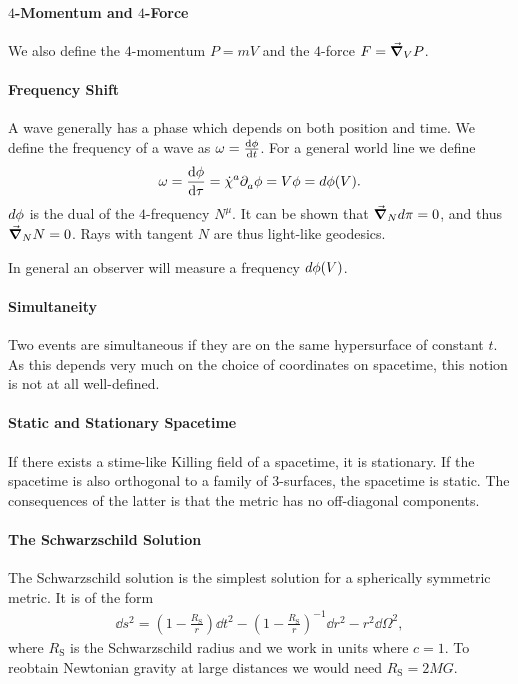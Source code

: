 \paragraph{$4$-Momentum and $4$-Force}
We also define the $4$-momentum $P = mV$ and the $4$-force $F = \grad_{V}{P}$.

\paragraph{Frequency Shift}
A wave generally has a phase which depends on both position and time. We define the frequency of a wave as $\omega = \dv{\phi}{t}$. For a general world line we define
\begin{align*}
	\omega = \dv{\phi}{\tau} = \dot{\chi}^{a}\partial^{}_{a}\phi = V\phi = d\phi(V).
\end{align*}
$d\phi$ is the dual of the $4$-frequency $N^{\mu}$. It can be shown that $\grad_{N}{d\pi} = 0$, and thus $\grad_{N}{N} = 0$. Rays with tangent $N$ are thus light-like geodesics.

In general an observer will measure a frequency $d\phi(V)$.

\paragraph{Simultaneity}
Two events are simultaneous if they are on the same hypersurface of constant $t$. As this depends very much on the choice of coordinates on spacetime, this notion is not at all well-defined.

\paragraph{Static and Stationary Spacetime}
If there exists a stime-like Killing field of a spacetime, it is stationary. If the spacetime is also orthogonal to a family of $3$-surfaces, the spacetime is static. The consequences of the latter is that the metric has no off-diagonal components.

\paragraph{The Schwarzschild Solution}
The Schwarzschild solution is the simplest solution for a spherically symmetric metric. It is of the form
\begin{align*}
	\dd{s}^{2} = \left(1 - \frac{R_{\text{S}}}{r}\right)\dd{t}^{2} - \left(1 - \frac{R_{\text{S}}}{r}\right)^{-1}\dd{r}^{2} - r^{2}\dd{\Omega}^{2},
\end{align*}
where $R_{\text{S}}$ is the Schwarzschild radius and we work in units where $c = 1$. To reobtain Newtonian gravity at large distances we would need $R_{\text{S}} = 2MG$.

